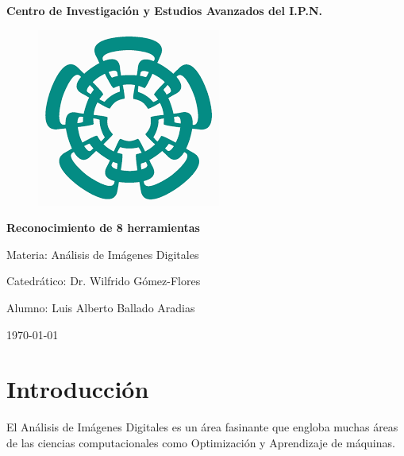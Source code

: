 \documentclass[a4paper, 11pt]{article}
\begin{document}

\begin{titlepage}
  \clearpage\thispagestyle{empty}
  \centering
  \vspace{1cm}
  {\Huge \textbf{Centro de Investigación y Estudios Avanzados del I.P.N.} \par}
  \vspace{1cm}

  \begin{figure}[h!]
    \centering
    \includegraphics[scale=0.5]{cinves.png}
  \end{figure}
    
  \vspace{1cm}
  {\Huge \textbf{Reconocimiento de 8 herramientas}\par} 
  \vspace{4cm}
  {\Large Materia: Análisis de Imágenes Digitales \par} 
  \vspace{3cm}
  {\Large Catedrático: Dr. Wilfrido Gómez-Flores \par} 
  \vspace{1cm}
  {\Large Alumno: Luis Alberto Ballado Aradias \par} 
  
  \vspace{3cm}
  {\normalsize \today \par}
\end{titlepage}

\tableofcontents{}

\renewcommand\lstlistlistingname{Lista de códigos}
\lstlistoflistings

\pagebreak

\section{Introducción}

El Análisis de Imágenes Digitales es un área fasinante que engloba muchas áreas de las ciencias computacionales como Optimización y Aprendizaje de máquinas.\\
\end{document}
